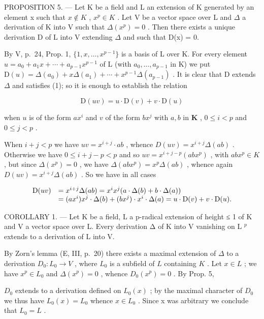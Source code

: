 PROPOSITION 5. --- Let K be a field and L an extension of K generated by an element x such that \(x \notin K\) , \(x^{p} \in K\) . Let V be a vector space over L and \(\Delta\) a derivation of K into V such that \(\Delta(x^{p}) = 0\) . Then there exists a unique derivation D of L into V extending \(\Delta\) and such that D(x) = 0.

By V, p.~24, Prop. 1, \(\{1, x, \ldots, x^{p-1}\}\) is a basis of L over K. For every element \(u = a_{0} + a_{1}x + \cdots + a_{p-1}x^{p-1}\) of L (with \(a_{0}, \ldots, a_{p-1}\) in K) we put \(\mathrm{D}(u) = \Delta(a_{0}) + x\Delta(a_{1}) + \cdots + x^{p-1}\Delta(a_{p-1})\) . It is clear that D extends \(\Delta\) and satisfies (1); so it is enough to establish the relation

\[
\mathrm{D} (u v) = u \cdot \mathrm{D} (v) + v \cdot \mathrm{D} (u)
\]

when \(u\) is of the form \(ax^i\) and \(v\) of the form \(bx^j\) with \(a, b\) in \(\mathbf{K}\) , \(0 \leqslant i < p\) and \(0 \leqslant j < p\) .

When \(i + j < p\) we have \(uv = x^{i + j} \cdot ab\) , whence \(D(uv) = x^{i + j}\Delta(ab)\) . Otherwise we have \(0 \leqslant i + j - p < p\) and so \(uv = x^{i + j - p}(abx^p)\) , with \(abx^p \in K\) , but since \(\Delta(x^p) = 0\) , we have \(\Delta(abx^p) = x^p\Delta(ab)\) , whence again \(D(uv) = x^{i + j}\Delta(ab)\) . So we have in all cases

\[
\begin{array}{r l} \mathrm{D} (u v) & = x ^ {i + j} \Delta (a b) = x ^ {i} x ^ {j} (a \cdot \Delta (b) + b \cdot \Delta (a)) \\ & = (a x ^ {i}) x ^ {j} \cdot \Delta (b) + (b x ^ {j}) \cdot x ^ {i} \cdot \Delta (a) = u \cdot \mathrm{D} (v) + v \cdot \mathrm{D} (u). \end{array}
\]

COROLLARY 1. --- Let K be a field, L a p-radical extension of height ≤ 1 of K and V a vector space over L. Every derivation Δ of K into V vanishing on L \(^{p}\) extends to a derivation of L into V.

By Zorn's lemma (E, III, p.~20) there exists a maximal extension of \(\Delta\) to a derivation \(D_0: L_0 \to V\) , where \(L_0\) is a subfield of \(L\) containing \(K\) . Let \(x \in L\) ; we have \(x^p \in L_0\) and \(\Delta(x^p) = 0\) , whence \(D_0(x^p) = 0\) . By Prop. 5,

\(D_{0}\) extends to a derivation defined on \(L_{0}(x)\) ; by the maximal character of \(D_{0}\) we thus have \(L_{0}(x) = L_{0}\) whence \(x \in L_{0}\) . Since x was arbitrary we conclude that \(L_{0} = L\) .


